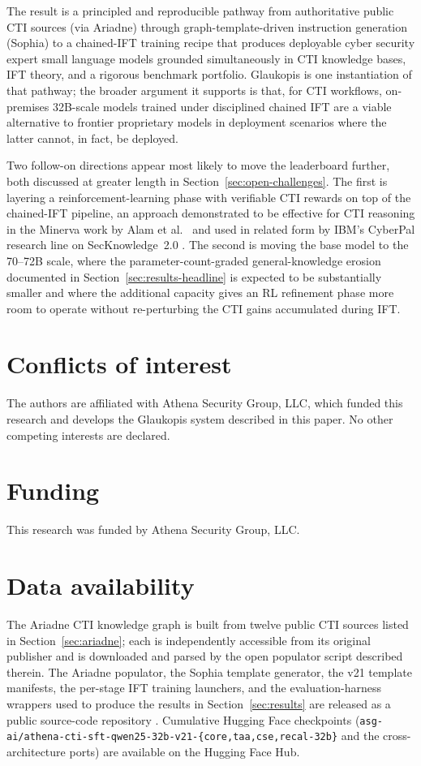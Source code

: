 \documentclass[webpdf,contemporary,large]{oup-authoring-template}
\theoremstyle{thmstyleone}
\theoremstyle{thmstyletwo}
\theoremstyle{thmstylethree}
\begin{document}
The result is a principled and reproducible pathway from authoritative public CTI sources (via Ariadne) through graph-template-driven instruction generation (Sophia) to a chained-IFT training recipe that produces deployable cyber security expert small language models grounded simultaneously in CTI knowledge bases, IFT theory, and a rigorous benchmark portfolio. Glaukopis is one instantiation of that pathway; the broader argument it supports is that, for CTI workflows, on-premises 32B-scale models trained under disciplined chained IFT are a viable alternative to frontier proprietary models in deployment scenarios where the latter cannot, in fact, be deployed.

Two follow-on directions appear most likely to move the leaderboard further, both discussed at greater length in Section~\ref{sec:open-challenges}. The first is layering a reinforcement-learning phase with verifiable CTI rewards on top of the chained-IFT pipeline, an approach demonstrated to be effective for CTI reasoning in the Minerva work by Alam et al.\ \cite{alam2026minerva} and used in related form by IBM's CyberPal research line on SecKnowledge~2.0 \cite{levi2025toward}. The second is moving the base model to the 70--72B scale, where the parameter-count-graded general-knowledge erosion documented in Section~\ref{sec:results-headline} is expected to be substantially smaller and where the additional capacity gives an RL refinement phase more room to operate without re-perturbing the CTI gains accumulated during IFT.


\section{Conflicts of interest}
The authors are affiliated with Athena Security Group, LLC, which funded this research and develops the Glaukopis system described in this paper. No other competing interests are declared.

\section{Funding}
This research was funded by Athena Security Group, LLC.

\section{Data availability}
The Ariadne CTI knowledge graph is built from twelve public CTI sources listed in Section~\ref{sec:ariadne}; each is independently accessible from its original publisher and is downloaded and parsed by the open populator script described therein. The Ariadne populator, the Sophia template generator, the v21 template manifests, the per-stage IFT training launchers, and the evaluation-harness wrappers used to produce the results in Section~\ref{sec:results} are released as a public source-code repository \cite{glaukopis2026repo}. Cumulative Hugging Face checkpoints (\texttt{asg-ai/athena-cti-sft-qwen25-32b-v21-\{core,taa,cse,recal-32b\}} and the cross-architecture ports) are available on the Hugging Face Hub.
\end{document}
